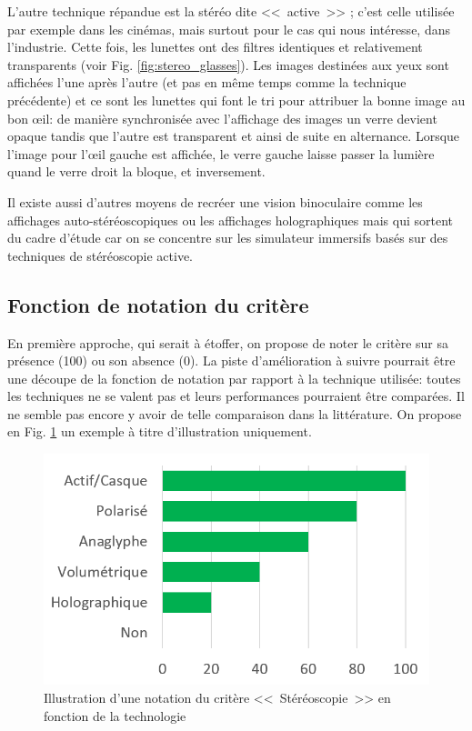 	\par L'autre technique répandue est la stéréo dite <<~active~>> ; c'est celle utilisée par exemple dans les cinémas, mais surtout pour le cas qui nous intéresse, dans l'industrie. Cette fois, les lunettes ont des filtres identiques et relativement transparents (voir Fig. \ref{fig:stereo_glasses}). Les images destinées aux yeux sont affichées l'une après l'autre (et pas en même temps comme la technique précédente) et ce sont les lunettes qui font le tri pour attribuer la bonne image au bon œil: de manière synchronisée avec l'affichage des images un verre devient opaque tandis que l'autre est transparent et ainsi de suite en alternance. Lorsque l'image pour l'œil gauche est affichée, le verre gauche laisse passer la lumière quand le verre droit la bloque, et inversement.
	
	\par Il existe aussi d'autres moyens de recréer une vision binoculaire comme les affichages auto-stéréoscopiques ou les affichages holographiques mais qui sortent du cadre d'étude car on se concentre sur les simulateur immersifs basés sur des techniques de stéréoscopie active. 
	
	\subsection{Fonction de notation du critère}
	\par En première approche, qui serait à étoffer, on propose de noter le critère sur sa présence (100) ou son absence (0). La piste d'amélioration à suivre pourrait être une découpe de la fonction de notation par rapport à la technique utilisée: toutes les techniques ne se valent pas et leurs performances pourraient être comparées. Il ne semble pas encore y avoir de telle comparaison dans la littérature. On propose en Fig. \ref{fig:stereo_grade_techno} un exemple à titre d'illustration uniquement.
	
	\begin{figure}
		\centering
		\includegraphics[scale=1]{Figures/StereoTechnoScore}
		\caption{Illustration d'une notation du critère <<~Stéréoscopie~>> en fonction de la technologie}
		\label{fig:stereo_grade_techno}
	\end{figure}
	

